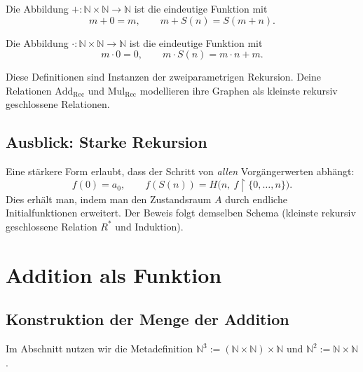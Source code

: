 \documentclass[main.tex]{subfiles}
\begin{document}
\begin{definition}
Die Abbildung \(+:\mathbb{N}\times\mathbb{N}\to\mathbb{N}\) ist die eindeutige Funktion mit
\[
m+0 = m,\qquad m+S(n) = S(m+n).
\]
\end{definition}

\begin{definition}
Die Abbildung \(\cdot:\mathbb{N}\times\mathbb{N}\to\mathbb{N}\) ist die eindeutige Funktion mit
\[
m\cdot 0 = 0,\qquad m\cdot S(n) = m\cdot n + m.
\]
\end{definition}

\begin{remark}
Diese Definitionen sind Instanzen der zweiparametrigen Rekursion. Deine
Relationen \(\mathrm{Add}_{\mathrm{Rec}}\) und \(\mathrm{Mul}_{\mathrm{Rec}}\) modellieren ihre Graphen
als kleinste rekursiv geschlossene Relationen.
\end{remark}

\section*{Ausblick: Starke Rekursion}
\begin{remark}
Eine stärkere Form erlaubt, dass der Schritt von \emph{allen} Vorgängerwerten
abhängt:
\[
f(0)=a_0,\qquad
f(S(n))=H\bigl(n,\ f\!\upharpoonright\!\{0,\dots,n\}\bigr).
\]
Dies erhält man, indem man den Zustandsraum \(A\) durch endliche Initialfunktionen
erweitert. Der Beweis folgt demselben Schema (kleinste rekursiv geschlossene
Relation \(R^\ast\) und Induktion).
\end{remark}



\chapter{Addition als Funktion}
\section{Konstruktion der Menge der Addition}

Im Abschnitt nutzen wir die Metadefinition \(\mathbb{N}^3:=(\mathbb{N}\times\mathbb{N})\times\mathbb{N}\) und \(\mathbb{N}^2:=\mathbb{N}\times\mathbb{N}\).
\end{document}
